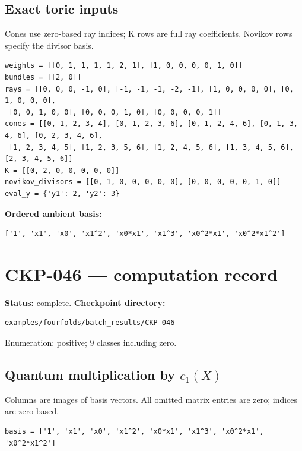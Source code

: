 \documentclass[10pt,a4paper]{article}
\begin{document}
\subsection*{Exact toric inputs}
Cones use zero-based ray indices; K rows are full ray coefficients. Novikov rows specify the divisor basis.

\begin{lstlisting}
weights = [[0, 1, 1, 1, 1, 2, 1], [1, 0, 0, 0, 0, 1, 0]]
bundles = [[2, 0]]
rays = [[0, 0, 0, -1, 0], [-1, -1, -1, -2, -1], [1, 0, 0, 0, 0], [0, 1, 0, 0, 0],
 [0, 0, 1, 0, 0], [0, 0, 0, 1, 0], [0, 0, 0, 0, 1]]
cones = [[0, 1, 2, 3, 4], [0, 1, 2, 3, 6], [0, 1, 2, 4, 6], [0, 1, 3, 4, 6], [0, 2, 3, 4, 6],
 [1, 2, 3, 4, 5], [1, 2, 3, 5, 6], [1, 2, 4, 5, 6], [1, 3, 4, 5, 6], [2, 3, 4, 5, 6]]
K = [[0, 2, 0, 0, 0, 0, 0]]
novikov_divisors = [[0, 1, 0, 0, 0, 0, 0], [0, 0, 0, 0, 0, 1, 0]]
eval_y = {'y1': 2, 'y2': 3}
\end{lstlisting}

\textbf{Ordered ambient basis:}
\begin{lstlisting}
['1', 'x1', 'x0', 'x1^2', 'x0*x1', 'x1^3', 'x0^2*x1', 'x0^2*x1^2']
\end{lstlisting}

\clearpage\section*{CKP-046 --- computation record}
\textbf{Status:} complete.
\textbf{Checkpoint directory:}
\begin{lstlisting}
examples/fourfolds/batch_results/CKP-046
\end{lstlisting}

Enumeration: positive; 9 classes including zero.
\subsection*{Quantum multiplication by $c_1(X)$}
Columns are images of basis vectors. All omitted matrix entries are zero; indices are zero based.

\begin{lstlisting}
basis = ['1', 'x1', 'x0', 'x1^2', 'x0*x1', 'x1^3', 'x0^2*x1', 'x0^2*x1^2']
\end{lstlisting}
\end{document}
